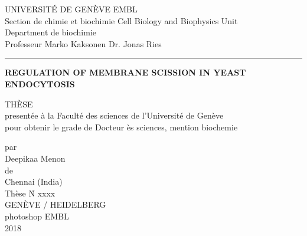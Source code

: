 \documentclass[
11pt, %
ngerman,
english, %
onehalfspacing,
hidelinks,
toctotoc, %
headsepline, %
]{MastersDoctoralThesis} %
\author{Markus Mund} %
\newcommand\blankpage{%
	\null
	\thispagestyle{empty}%
	\newpage}
\begin{document}
\frontmatter %

\pagestyle{plain} %

%
\begin{titlepage}

\noindent\large{UNIVERSIT\'E DE GEN\`EVE\hspace*{\fill} EMBL\\
Section de chimie et biochimie\hspace*{\fill} Cell Biology and Biophysics Unit\\
Department de biochimie\\
Professeur Marko Kaksonen\hspace*{\fill} Dr. Jonas Ries\\}
\noindent\rule{13.6cm}{0.4pt}

\vspace{3cm}
\begin{center}
\LARGE\textbf{REGULATION OF MEMBRANE SCISSION IN YEAST ENDOCYTOSIS} \\
	\vspace{3cm}
\end{center}

\begin{center}	
	{TH\`ESE\\
	present\'ee \`a la Facult\'e des sciences de l'Universit\'e de Gen\`eve\\
	pour obtenir le grade de Docteur \`es sciences, mention biochemie\\}

\vspace{1.5cm}
	par\\
	Deepikaa Menon\\
	\vspace{1cm}
	de\\
	Chennai (India)\\
	\vspace{2cm}
	Th\`ese N\r{} xxxx\\
	\vspace{1cm}
	GEN\`EVE / HEIDELBERG\\
	photoshop EMBL\\	
	2018\\
	
	
\end{center}

\end{titlepage}
\end{document}
